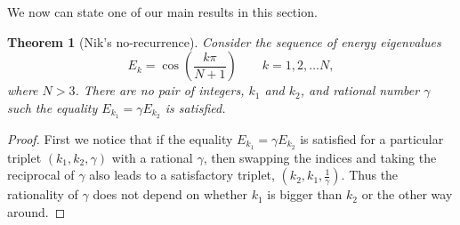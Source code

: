 \documentclass[a4paper, 10pt]{article}
\theoremstyle{plain}
\newtheorem*{theorem*}{Theorem}
\begin{document}
\noindent
We now can state one of our main results in this section.
\begin{theorem*}[Nik's no-recurrence]
    Consider the sequence of energy eigenvalues
    \begin{equation*}
        E_{k} = \cos{\!\left ( \frac{k \pi}{N+1} \right )}
        \qquad k=1, 2, \dots N,
    \end{equation*}
    where $N >3$. There are no pair of integers, $k_{1}$ and $k_{2}$, and
    rational number $\gamma$ such the equality $E_{k_{1}} = \gamma E_{k_{2}}$ is
    satisfied.
\end{theorem*}
\begin{proof}
    First we notice that if the equality $E_{k_{1}} = \gamma E_{k_{2}}$ is
    satisfied for a particular triplet $(k_{1}, k_{2}, \gamma)$ with a rational
    $\gamma$, then swapping the indices and taking the reciprocal of $\gamma$
    also leads to a satisfactory triplet, $(k_{2}, k_{1}, \frac{1}{\gamma})$.
    Thus the rationality of $\gamma$ does not depend on whether $k_{1}$ is
    bigger than $k_{2}$ or the other way around.


\end{proof}
\end{document}
